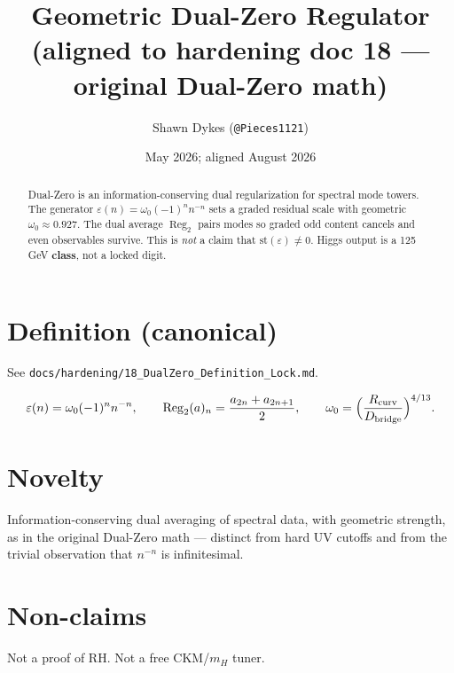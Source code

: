 \documentclass[11pt,a4paper]{article}
\title{\textbf{Geometric Dual-Zero Regulator}\\[0.2em]
\large (aligned to hardening doc 18 — original Dual-Zero math)}
\author{Shawn Dykes (\texttt{@Pieces1121})}
\date{May 2026; aligned August 2026}
\begin{document}
\maketitle

\begin{abstract}
Dual-Zero is an information-conserving dual regularization for spectral mode
towers. The generator $\varepsilon(n)=\omega_0(-1)^n n^{-n}$ sets a graded residual
scale with geometric $\omega_0\approx 0.927$. The dual average $\operatorname{Reg}_2$
pairs modes so graded odd content cancels and even observables survive. This is
\emph{not} a claim that $\mathrm{st}(\varepsilon)\neq 0$. Higgs output is a 125\,GeV
\textbf{class}, not a locked digit.
\end{abstract}

\section{Definition (canonical)}

See \texttt{docs/hardening/18\_DualZero\_Definition\_Lock.md}.

\[
\varepsilon(n)=\omega_0(-1)^n n^{-n},\qquad
\operatorname{Reg}_2(a)_n=\frac{a_{2n}+a_{2n+1}}{2},\qquad
\omega_0=\Bigl(\frac{R_{\rm curv}}{D_{\rm bridge}}\Bigr)^{4/13}.
\]

\section{Novelty}

Information-conserving dual averaging of spectral data, with geometric strength,
as in the original Dual-Zero math — distinct from hard UV cutoffs and from the
trivial observation that $n^{-n}$ is infinitesimal.

\section{Non-claims}

Not a proof of RH. Not a free CKM/$m_H$ tuner.
\end{document}
